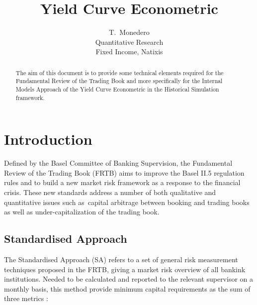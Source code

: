 \documentclass[10pt,a4paper]{report}
\begin{document}
\title{Yield Curve Econometric}
\author{T.\ Monedero \\
Quantitative Research\\
Fixed Income, Natixis\\
}
\maketitle

\begin{abstract}
The aim of this document is to provide some technical elements required for
the Fundamental Review of the Trading Book and more specifically for the
Internal Models Approach of the Yield Curve Econometric in the Historical
Simulation framework.
\end{abstract}


\tableofcontents\newpage
\renewcommand\thesection {\Roman{section}}
\renewcommand{\thesubsubsection}{\arabic{subsubsection} }
\setlength{\footnotesep}{2em} 
\renewcommand{\footnoterule}{\hspace*{0em}\dotfill\hspace*{0em}} 



\section{Introduction}

Defined by the Basel Committee of Banking Supervision, the Fundamental
Review of the Trading Book (FRTB) aims to improve the Basel II.5 regulation
rules and to build a new market risk framework as a response to the
financial crisis. These new standards address a number of both qualitative
and quantitative issues such as\ capital arbitrage between booking and
trading books as well as under-capitalization of the trading book.

\bigskip 

\subsection{Standardised Approach}

The Standardised Approach (SA) refers to a set of general risk measurement
techniques proposed in the FRTB, giving a market risk overview of all
bankink institutions. Needed to be calculated and reported to the relevant
supervisor on a monthly basis, this method provide minimum capital
requirements as the sum of three metrics :

\bigskip
\end{document}
